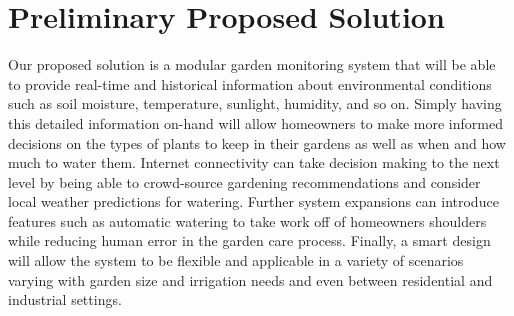 \section{Preliminary Proposed Solution}
	Our proposed solution is a modular garden monitoring system that will be able to provide real-time and historical information about environmental conditions such as soil moisture, temperature, sunlight, humidity, and so on. Simply having this detailed information on-hand will allow homeowners to make more informed decisions on the types of plants to keep in their gardens as well as when and how much to water them. Internet connectivity can take decision making to the next level by being able to crowd-source gardening recommendations and consider local weather predictions for watering. Further system expansions can introduce features such as automatic watering to take work off of homeowners shoulders while reducing human error in the garden care process. Finally, a smart design will allow the system to be flexible and applicable in a variety of scenarios varying with garden size and irrigation needs and even between residential and industrial settings.